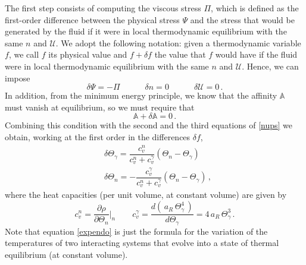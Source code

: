 \documentclass[a4paper, amsfonts, amssymb, amsmath, reprint, twocolumn, showkeys, nofootinbib]{revtex4-2}
\begin{document}
The first step consists of computing the viscous stress $\Pi$, which is defined as the first-order difference between the physical stress $\Psi$ and the stress that would be generated by the fluid if it were in local thermodynamic equilibrium with the same $n$ and $\mathcal{U}$. We adopt the following notation: given a thermodynamic variable $f$, we call $f$ its physical value and $f+\delta f$ the value that $f$ would have if the fluid were in local thermodynamic equilibrium with the same $n$ and $\mathcal{U}$. 
Hence, we can impose
\begin{equation}\label{nups}
\delta \Psi = -\Pi   \quad \quad\quad  
\delta n =0  \quad \quad \quad  
\delta \mathcal{U}=0 \, .
\end{equation}
In addition, from the minimum energy principle, we know that the affinity $\mathbb{A}$ must vanish at equilibrium, so we must require that
\begin{equation}
\mathbb{A}+\delta \mathbb{A}=0 \, .
\end{equation} 
Combining this condition with the second and the third equations of \eqref{nups} we obtain, working at the first order in the differences $\delta f$,
\begin{equation}\label{expendo}
\begin{split}
& \delta \Theta_\gamma = \dfrac{c_v^n}{c_v^n + c_v^\gamma} (\Theta_n - \Theta_\gamma)   
\\
& \delta \Theta_n =- \dfrac{c_v^\gamma}{c_v^n + c_v^\gamma} (\Theta_n - \Theta_\gamma) \, , 
\end{split}
\end{equation}
where  the heat capacities (per unit volume, at constant volume) are given by
\begin{equation}
c_v^n = \dfrac{\partial \rho}{\partial \Theta_n} \bigg|_{n}   
\qquad  
c_v^\gamma = \dfrac{d (\,a_R\, \Theta_\gamma^4\,)}{d \Theta_\gamma} = 4 \, a_R \, \Theta_\gamma^3 \, .
\end{equation}
Note that equation \eqref{expendo} is just the formula for the variation of the temperatures of two interacting systems that evolve into a state of thermal equilibrium (at constant volume).
\end{document}
